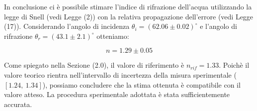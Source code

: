 In conclusione ci è possibile stimare l'indice di rifrazione dell'acqua utilizzando la legge di Snell (vedi Legge (2)) con la relativa propagazione dell'errore (vedi Legge (17)). Considerando l'angolo di incidenza $\theta_i=(62.06\pm 0.02)^{\circ}$ e l'angolo di rifrazione $\theta_r=(43.1\pm 2.1)^{\circ}$ otteniamo:

\begin{equation}
	n = 1.29\pm 0.05
\end{equation}

Come spiegato nella Sezione (2.0), il valore di riferimento è $n_{rif}=1.33$. Poichè il valore teorico rientra nell'intervallo di incertezza della misura sperimentale ($[1.24,\ 1.34]$), possiamo concludere che la stima ottenuta è compatibile con il valore atteso. La procedura sperimentale adottata è stata sufficientemente accurata.